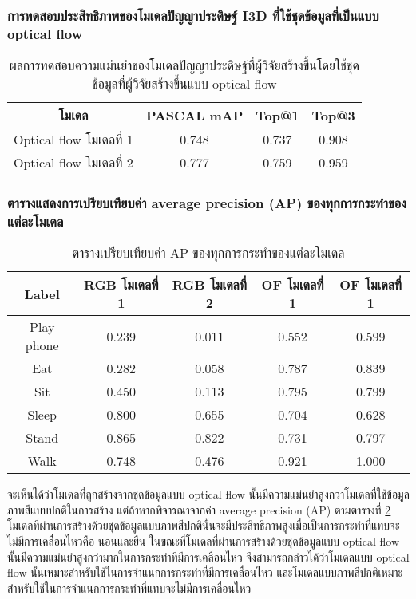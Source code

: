 \subsubsection{การทดสอบประสิทธิภาพของโมเดลปัญญาประดิษฐ์ I3D ที่ใช้ชุดข้อมูลที่เป็นแบบ optical flow}
\begin{table}[!ht]
	\centering
	\begin{tabular}{|c|c|c|c|}
			\hline
			{โมเดล}	&	{PASCAL mAP}	&	{Top@1}	&	{Top@3}\\
			\hline
			Optical flow โมเดลที่ 1	& 0.748	& 0.737	& 0.908	\\
			Optical flow โมเดลที่ 2	& 0.777	& 0.759	& 0.959	\\
			\hline
	\end{tabular}
\caption{ผลการทดสอบความแม่นยำของโมเดลปัญญาประดิษฐ์ที่ผู้วิจัยสร้างขึ้นโดยใช้ชุดข้อมูลที่ผู้วิจัยสร้างขึ้นแบบ optical flow}
\label{tab:I3D_OF_performance}
\end{table}


\subsubsection{ตารางแสดงการเปรียบเทียบค่า average precision (AP) ของทุกการกระทำของแต่ละโมเดล}
\label{sec:I3D_AP}
\begin{table}[!ht]
	\centering
	\begin{tabular}{|c|c|c|c|c|}
			\hline
			{Label} & {RGB โมเดลที่ 1} & {RGB โมเดลที่ 2} & {OF โมเดลที่ 1} & {OF โมเดลที่ 1}\\
			\hline
			Play phone  & 0.239 & 0.011 & 0.552 & 0.599	\\
			Eat			& 0.282	& 0.058	& 0.787	& 0.839	\\
			Sit		 	& 0.450 & 0.113 & 0.795 & 0.799	\\
			Sleep		& 0.800	& 0.655	& 0.704	& 0.628	\\
			Stand		& 0.865	& 0.822	& 0.731	& 0.797	\\
			Walk		& 0.748	& 0.476	& 0.921	& 1.000	\\
			\hline
	\end{tabular}
\caption{ตารางเปรียบเทียบค่า AP ของทุกการกระทำของแต่ละโมเดล}
\label{tab:I3D_RGB_OF_AP}
\end{table}
จะเห็นได้ว่าโมเดลที่ถูกสร้างจากชุดข้อมูลแบบ optical flow นั้นมีความแม่นยำสูงกว่าโมเดลที่ใช้ข้อมูลภาพสีแบบปกติในการสร้าง แต่ถ้าหากพิจารณาจากค่า average precision (AP) 
ตามตารางที่ \ref{tab:I3D_RGB_OF_AP} โมเดลที่ผ่านการสร้างด้วยชุดข้อมูลแบบภาพสีปกตินั้นจะมีประสิทธิภาพสูงเมื่อเป็นการกระทำที่แทบจะไม่มีการเคลื่อนไหวคือ นอนและยืน 
ในขณะที่โมเดลที่ผ่านการสร้างด้วยชุดข้อมูลแบบ optical flow นั้นมีความแม่นยำสูงกว่ามากในการกระทำที่มีการเคลื่อนไหว จึงสามารถกล่าวได้ว่าโมเดลแบบ optical flow 
นั้นเหมาะสำหรับใช้ในการจำแนกการกระทำที่มีการเคลื่อนไหว และโมเดลแบบภาพสีปกติเหมาะสำหรับใช้ในการจำแนกการกระทำที่แทบจะไม่มีการเคลื่อนไหว

